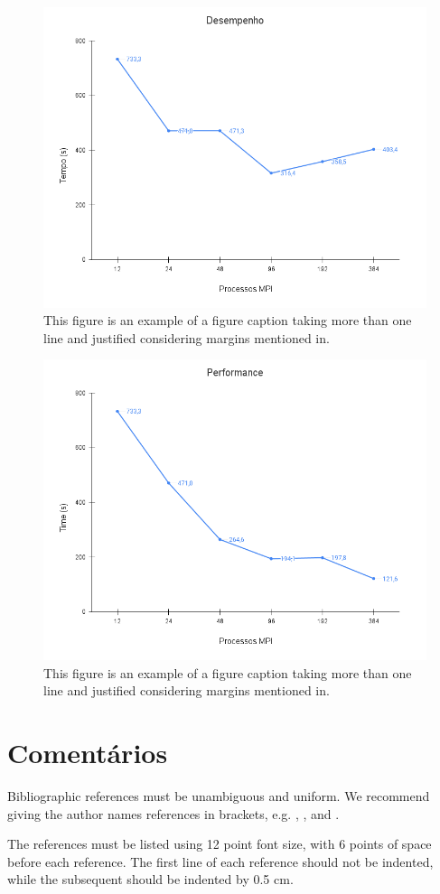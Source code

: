\documentclass[12pt]{article}
\begin{document}
\begin{figure}[ht]
\centering
\includegraphics[width=.7\textwidth]{figures/perfupto48pernode.png}
\caption{This figure is an example of a figure caption taking more than one line and justified considering margins mentioned in.}
\label{fig:48pernode}
\end{figure}


\begin{figure}[ht]
\centering
\includegraphics[width=.7\textwidth]{figures/perfupto24pernode.png}
\caption{This figure is an example of a figure caption taking more than one line and justified considering margins mentioned in.}
\label{fig:24pernode}
\end{figure}


\section{Comentários}



Bibliographic references must be unambiguous and uniform.  We recommend giving
the author names references in brackets, e.g. \cite{knuth:84},
\cite{boulic:91}, and \cite{smith:99}.

The references must be listed using 12 point font size, with 6 points of space
before each reference. The first line of each reference should not be
indented, while the subsequent should be indented by 0.5 cm.



\end{document}
